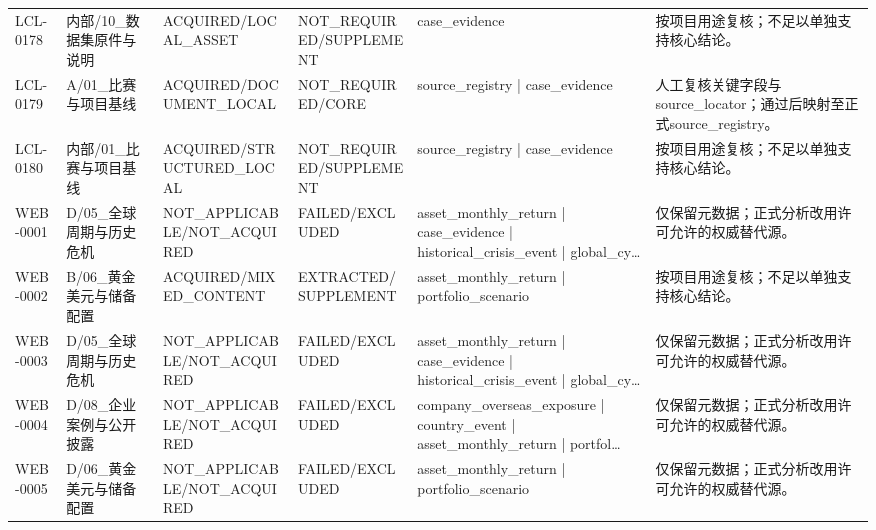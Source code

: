 \begin{landscape}
\begin{longtable}{p{1.8cm}p{2.6cm}p{2.6cm}p{2.6cm}p{4.8cm}p{7.2cm}}
LCL-0178 & 内部/\allowbreak{}10\_\allowbreak{}数据集原件与说明 & ACQUIRED/\allowbreak{}LOCAL\_\allowbreak{}ASSET & NOT\_\allowbreak{}REQUIRED/\allowbreak{}SUPPLEMENT & case\_\allowbreak{}evidence & 按项目用途复核；不足以单独支持核心结论。\\
LCL-0179 & A/\allowbreak{}01\_\allowbreak{}比赛与项目基线 & ACQUIRED/\allowbreak{}DOCUMENT\_\allowbreak{}LOCAL & NOT\_\allowbreak{}REQUIRED/\allowbreak{}CORE & source\_\allowbreak{}registry | case\_\allowbreak{}evidence & 人工复核关键字段与source\_\allowbreak{}locator；通过后映射至正式source\_\allowbreak{}registry。\\
LCL-0180 & 内部/\allowbreak{}01\_\allowbreak{}比赛与项目基线 & ACQUIRED/\allowbreak{}STRUCTURED\_\allowbreak{}LOCAL & NOT\_\allowbreak{}REQUIRED/\allowbreak{}SUPPLEMENT & source\_\allowbreak{}registry | case\_\allowbreak{}evidence & 按项目用途复核；不足以单独支持核心结论。\\
WEB-0001 & D/\allowbreak{}05\_\allowbreak{}全球周期与历史危机 & NOT\_\allowbreak{}APPLICABLE/\allowbreak{}NOT\_\allowbreak{}ACQUIRED & FAILED/\allowbreak{}EXCLUDED & asset\_\allowbreak{}monthly\_\allowbreak{}return | case\_\allowbreak{}evidence | historical\_\allowbreak{}crisis\_\allowbreak{}event | global\_\allowbreak{}cy… & 仅保留元数据；正式分析改用许可允许的权威替代源。\\
WEB-0002 & B/\allowbreak{}06\_\allowbreak{}黄金美元与储备配置 & ACQUIRED/\allowbreak{}MIXED\_\allowbreak{}CONTENT & EXTRACTED/\allowbreak{}SUPPLEMENT & asset\_\allowbreak{}monthly\_\allowbreak{}return | portfolio\_\allowbreak{}scenario & 按项目用途复核；不足以单独支持核心结论。\\
WEB-0003 & D/\allowbreak{}05\_\allowbreak{}全球周期与历史危机 & NOT\_\allowbreak{}APPLICABLE/\allowbreak{}NOT\_\allowbreak{}ACQUIRED & FAILED/\allowbreak{}EXCLUDED & asset\_\allowbreak{}monthly\_\allowbreak{}return | case\_\allowbreak{}evidence | historical\_\allowbreak{}crisis\_\allowbreak{}event | global\_\allowbreak{}cy… & 仅保留元数据；正式分析改用许可允许的权威替代源。\\
WEB-0004 & D/\allowbreak{}08\_\allowbreak{}企业案例与公开披露 & NOT\_\allowbreak{}APPLICABLE/\allowbreak{}NOT\_\allowbreak{}ACQUIRED & FAILED/\allowbreak{}EXCLUDED & company\_\allowbreak{}overseas\_\allowbreak{}exposure | country\_\allowbreak{}event | asset\_\allowbreak{}monthly\_\allowbreak{}return | portfol… & 仅保留元数据；正式分析改用许可允许的权威替代源。\\
WEB-0005 & D/\allowbreak{}06\_\allowbreak{}黄金美元与储备配置 & NOT\_\allowbreak{}APPLICABLE/\allowbreak{}NOT\_\allowbreak{}ACQUIRED & FAILED/\allowbreak{}EXCLUDED & asset\_\allowbreak{}monthly\_\allowbreak{}return | portfolio\_\allowbreak{}scenario & 仅保留元数据；正式分析改用许可允许的权威替代源。\\

\end{longtable}
\end{landscape}
